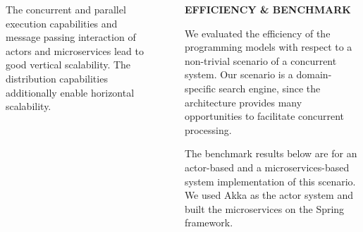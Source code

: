 \documentclass[final,hyperref={pdfpagelabels=true}]{beamer}
\begin{document}
\begin{frame}
\begin{columns}[t]
\begin{column}{.46\textwidth}
{\begin{description}
          \vspace*{\baselineskip}

          \item[\textbf{\textsf{Scalability}}] The concurrent and parallel execution capabilities and message passing interaction of actors and microservices lead to good vertical scalability. The distribution capabilities additionally enable horizontal scalability.
        \end{description}
        
      }
    \end{column}
    \begin{column}{.04\textwidth}
      \end{column}
    \begin{column}{.46\textwidth}
      \textsf{\textbf{EFFICIENCY \& BENCHMARK}} \\
      \vspace*{\baselineskip}
      {\lmodern
        We evaluated the efficiency of the programming models with respect to a non-trivial scenario of a concurrent system. Our scenario is a domain-specific search engine, since the architecture provides many opportunities to facilitate concurrent processing. 
        
        \vspace*{\baselineskip}
        
        The benchmark results below are for an actor-based and a microservices-based system implementation of this scenario. We used Akka as the actor system and built the microservices on the Spring framework.
      }

      \vspace*{\baselineskip}
      

\end{column}
\end{columns}
\end{frame}
\end{document}
